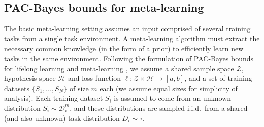 \documentclass[letterpaper]{article} %
\theoremstyle{definition}
\begin{document}
\subsection{PAC-Bayes bounds for meta-learning} \label{sec:meta}

The basic meta-learning setting assumes an input comprised of several training tasks from a single task environment. A meta-learning algorithm must extract the necessary common knowledge (in the form of a prior) to efficiently learn new tasks in the same environment. Following the formulation of PAC-Bayes bounds for lifelong learning \citep{Pentina2014} and meta-learning \citep{Amit2018}, we assume a shared sample space $\mathcal{Z}$, hypothesis space $\mathcal{H}$ and loss function $\ell:\mathcal{Z}\times \mathcal{H}\rightarrow [a,b]$, and a set of training datasets $\{S_1,...,S_N\}$ of size $m$ each (we assume equal sizes for simplicity of analysis). Each training dataset $S_i$ is assumed to come from an unknown distribution $S_i\sim \mathcal{D}^m_i$, and these distributions are sampled i.i.d.\ from a shared (and also unknown) task distribution $D_i\sim \tau$.
\end{document}
